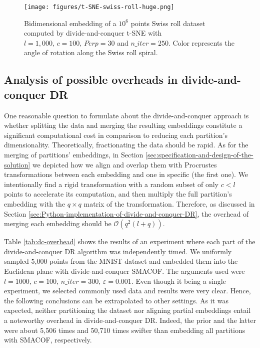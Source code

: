 \begin{figure}
    \centering
    \texttt{[image: figures/t-SNE-swiss-roll-huge.png]}
    \caption{Bidimensional embedding of a $10^6$ points Swiss roll dataset computed by divide-and-conquer t-SNE with $l=1,000, \, c=100, \, Perp=30$ and $n\_iter=250$. Color represents the angle of rotation along the Swiss roll spiral.}
    \label{fig:t-SNE-huge}
\end{figure}

\subsection{Analysis of possible overheads in divide-and-conquer DR}
\label{sec:overheads-DR}

One reasonable question to formulate about the divide-and-conquer approach is whether splitting the data and merging the resulting embeddings constitute a significant computational cost in comparison to reducing each partition's dimensionality. Theoretically, fractionating the data should be rapid. As for the merging of partitions' embeddings, in Section \ref{sec:specification-and-design-of-the-solution} we depicted how we align and overlap them with Procrustes transformations between each embedding and one in specific (the first one). We intentionally find a rigid transformation with a random subset of only $c < l$ points to accelerate its computation, and then multiply the full partition's embedding with the $q\times q$ matrix of the transformation. Therefore, as discussed in Section \ref{sec:Python-implementation-of-divide-and-conquer-DR}, the overhead of merging each embedding should be $\mathcal{O}(q^2(l+q))$.

Table \ref{tab:dc-overhead} shows the results of an experiment where each part of the divide-and-conquer DR algorithm was independently timed. We uniformly sampled 5,000 points from the MNIST dataset and embedded them into the Euclidean plane with divide-and-conquer SMACOF. The arguments used were $l=1000,\, c=100,\, n\_iter = 300,\, \varepsilon = 0.001$. Even though it being a single experiment, we selected commonly used data and results were very clear.  Hence, the following conclusions can be extrapolated to other settings. As it was expected, neither partitioning the dataset nor aligning partial embeddings entail a noteworthy overhead in divide-and-conquer DR. Indeed, the prior and the latter were about 5,506 times and 50,710 times swifter than embedding all partitions with SMACOF, respectively.

